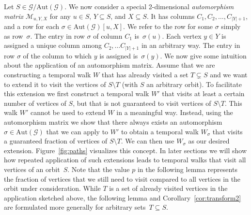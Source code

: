 \documentclass[10pt,a4paper]{article}
\newcommand{\auttg}{\ensuremath{\text{Aut}(\mathcal{G})}}
\newcommand{\torb}{\ensuremath{\mathcal{G}/\auttg}}
\begin{document}
    Let $S \in \torb$. We now consider a special 2-dimensional
    \textit{automorphism matrix $\mathcal{M}_{u, Y, X}$} for {any $u\in S$, $Y\subseteq S$, and $X \subseteq S$.}
    {It has} columns $C_1, C_2,
    \ldots, C_{|Y|+1}$, and a row for each $\sigma \in \auttg[u,X]$.
    We refer to the row for some $\sigma$ simply as row~$\sigma$.
    {The entry in row $\sigma$ of column $C_1$ is~$\sigma(u)$.}
    {Each vertex $y\in Y$ is assigned a unique column among $C_2,
    \ldots C_{|Y|+1}$ in an arbitrary way. The entry in row $\sigma$ of the
    column to which $y$ is assigned is~$\sigma(y)$.} We now give some intuition
    about the application of an automorphism matrix. Assume that we are
    constructing a temporal walk $W$ that has already visited a set $T
    \subsetneq S$ and we want to extend it to visit the vertices of $S \setminus
    T$ (with $S$ an arbitrary orbit). To facilitate this extension we first
    construct a temporal walk $W'$ that visits at least a certain number of
    vertices of $S$, but that is not guaranteed to visit vertices of $S
    \setminus T$. This walk $W'$ cannot be used to extend $W$ in a meaningful
    way. Instead, using the automorphism matrix we show that there always exists
    an automorphism $\sigma \in \text{Aut}(\mathcal{G})$ that we can apply to
    $W'$ to obtain a temporal walk $W_{\sigma}$ that visits a guaranteed
    fraction of vertices of $S \setminus T$. We can then use $W_{\sigma}$ as our
    desired extension. {Figure~\ref{fig:paths} visualizes this concept.} In
    later sections we will show how repeated application of such extensions
    leads to temporal walks that visit all vertices of an orbit~$S$. Note that
    the value $p$ in the following lemma represents the fraction of vertices
    that we still need to visit compared to all vertices in the orbit under
    consideration.
	{While $T$ is a set of already visited vertices in the application
	sketched above, the following lemma and Corollary~\ref{cor:transform2}
	are formulated more generally for arbitrary sets~$T\subseteq S$.}
\end{document}
